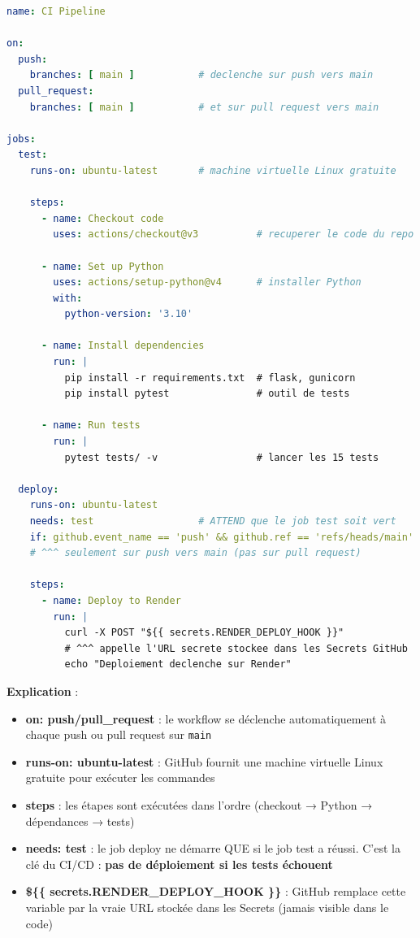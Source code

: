 \documentclass[12pt,a4paper]{article}
\begin{document}
\begin{lstlisting}[language=yaml, caption={Le workflow GitHub Actions complet}]
name: CI Pipeline

on:
  push:
    branches: [ main ]           # declenche sur push vers main
  pull_request:
    branches: [ main ]           # et sur pull request vers main

jobs:
  test:
    runs-on: ubuntu-latest       # machine virtuelle Linux gratuite

    steps:
      - name: Checkout code
        uses: actions/checkout@v3          # recuperer le code du repo

      - name: Set up Python
        uses: actions/setup-python@v4      # installer Python
        with:
          python-version: '3.10'

      - name: Install dependencies
        run: |
          pip install -r requirements.txt  # flask, gunicorn
          pip install pytest               # outil de tests

      - name: Run tests
        run: |
          pytest tests/ -v                 # lancer les 15 tests

  deploy:
    runs-on: ubuntu-latest
    needs: test                  # ATTEND que le job test soit vert
    if: github.event_name == 'push' && github.ref == 'refs/heads/main'
    # ^^^ seulement sur push vers main (pas sur pull request)

    steps:
      - name: Deploy to Render
        run: |
          curl -X POST "${{ secrets.RENDER_DEPLOY_HOOK }}"
          # ^^^ appelle l'URL secrete stockee dans les Secrets GitHub
          echo "Deploiement declenche sur Render"
\end{lstlisting}

\textbf{Explication} :
\begin{itemize}
    \item \textbf{on: push/pull\_request} : le workflow se déclenche automatiquement à chaque push ou pull request sur \texttt{main}
    \item \textbf{runs-on: ubuntu-latest} : GitHub fournit une machine virtuelle Linux gratuite pour exécuter les commandes
    \item \textbf{steps} : les étapes sont exécutées dans l'ordre (checkout → Python → dépendances → tests)
    \item \textbf{needs: test} : le job deploy ne démarre QUE si le job test a réussi. C'est la clé du CI/CD : \textbf{pas de déploiement si les tests échouent}
    \item \textbf{\$\{\{ secrets.RENDER\_DEPLOY\_HOOK \}\}} : GitHub remplace cette variable par la vraie URL stockée dans les Secrets (jamais visible dans le code)
\end{itemize}
\end{document}
